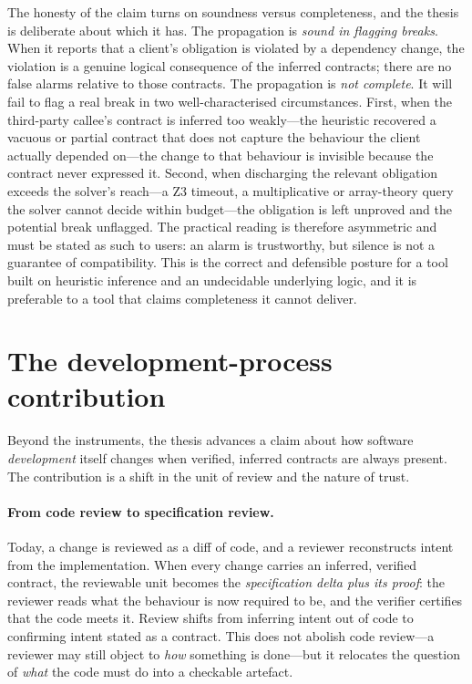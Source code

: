 The honesty of the claim turns on soundness versus completeness, and the thesis is
deliberate about which it has. The propagation is \emph{sound in flagging breaks}.
When it reports that a client's obligation is violated by a dependency change, the
violation is a genuine logical consequence of the inferred contracts; there are no
false alarms relative to those contracts. The propagation is \emph{not complete}.
It will fail to flag a real break in two well-characterised circumstances. First,
when the third-party callee's contract is inferred too weakly---the heuristic
recovered a vacuous or partial contract that does not capture the behaviour the
client actually depended on---the change to that behaviour is invisible because the
contract never expressed it. Second, when discharging the relevant obligation
exceeds the solver's reach---a Z3 timeout, a multiplicative or array-theory query
the solver cannot decide within budget---the obligation is left unproved and the
potential break unflagged. The practical reading is therefore asymmetric and must
be stated as such to users: an alarm is trustworthy, but silence is not a
guarantee of compatibility. This is the correct and defensible posture for a tool
built on heuristic inference and an undecidable underlying logic, and it is
preferable to a tool that claims completeness it cannot deliver.

\section{The development-process contribution}

Beyond the instruments, the thesis advances a claim about how software
\emph{development} itself changes when verified, inferred contracts are always
present. The contribution is a shift in the unit of review and the nature of
trust.

\paragraph{From code review to specification review.} Today, a change is reviewed
as a diff of code, and a reviewer reconstructs intent from the implementation. When
every change carries an inferred, verified contract, the reviewable unit becomes
the \emph{specification delta plus its proof}: the reviewer reads what the
behaviour is now required to be, and the verifier certifies that the code meets it.
Review shifts from inferring intent out of code to confirming intent stated as a
contract. This does not abolish code review---a reviewer may still object to
\emph{how} something is done---but it relocates the question of \emph{what} the code
must do into a checkable artefact.

